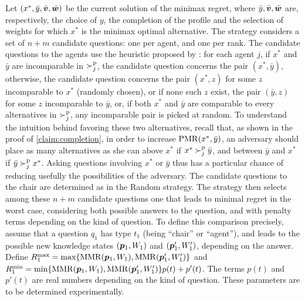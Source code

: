 \documentclass[sigconf, anonymous]{aamas}
\begin{document}
Let $(x^{*},\bar{y}, \bar{\bm{v}}, \bar{\bm{w}})$ be the current solution of the minimax regret, where $\bar{y}, \bar{\bm{v}}, \bar{\bm{w}}$ are, respectively, the choice of $y$, the completion of the profile and the selection of weights for which $x^{*}$ is the minimax optimal alternative. 
The  strategy considers a set of $n + m$ candidate questions: one per agent, and one per rank.
The candidate questions to the agents use the heuristic proposed by \citet{Lu2011}: for each agent $j$, if $x^*$ and $\bar{y}$ are incomparable in $\succ^\text{p}_j$, the candidate question concerns the pair $(x^*, \bar{y})$, otherwise, the candidate question concerns the pair $(x^*, z)$ for some $z$ incomparable to $x^*$ (randomly chosen), or if none such $z$ exist, the pair $(\bar{y}, z)$ for some $z$ incomparable to $\bar{y}$, or, if both $x^*$ and $\bar{y}$ are comparable to every alternatives in $\succ^\text{p}_j$, any incomparable pair is picked at random. 
To understand the intuition behind favoring these two alternatives, recall that, as shown in the proof of \cref{claim:completion}, in order to increase $\operatorname{PMR}(x^{*},\bar{y})$, an adversary should place as many alternatives as she can above $x^{*}$ if $x^* \succ^\text{p}_j \bar{y}$, and between $\bar{y}$ and $x^{*}$ if $\bar{y} \succ^\text{p}_j x^*$.  Asking questions involving $x^*$ or $\bar{y}$ thus has a particular chance of reducing usefully the possibilities of the adversary.
The candidate questions to the chair are determined as in the Random strategy.
The strategy then selects among these $n + m$ candidate questions one that leads to minimal regret in the worst case, considering both possible answers to the question, and with penalty terms depending on the kind of question. To define this comparison precisely, assume that a question $q_1$ has type $t_1$ (being “chair” or “agent”), and leads to the possible new knowledge states $({\bm{p}}_1, W_1)$ and $({\bm{p}}'_1, W'_1)$, depending on the answer. 
Define $R^{\max}_1 = \max\{\operatorname{MMR}({\bm{p}}_1, W_1), \operatorname{MMR}({\bm{p}}'_1, W'_1)\}$
and $R^{\min}_1 = \min\{\operatorname{MMR}({\bm{p}}_1, W_1), \operatorname{MMR}({\bm{p}}'_1, W'_1)\} p(t) + p'(t)$.
The terms $p(t)$ and $p'(t)$ are real numbers depending on the kind of question. These parameters are to be determined experimentally.
\end{document}

